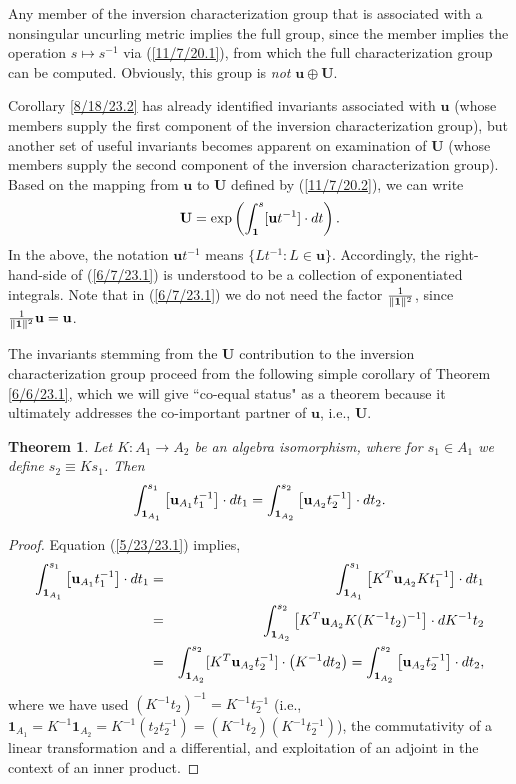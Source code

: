 \documentclass{amsart}
\numberwithin{equation}{section}
\newtheorem{theorem}{Theorem}
\theoremstyle{definition}
\numberwithin{theorem}{section}
\begin{document}
Any member of the inversion characterization group that is associated with a nonsingular uncurling metric implies the full group, since the member implies the operation $s\mapsto s^{-1}$ via (\ref{11/7/20.1}), from which the full characterization group can be computed.  Obviously, this group is {\it not} $\mathbf{u}\oplus\mathbf{U}$. 

Corollary \ref{8/18/23.2} has already identified invariants associated with $\mathbf{u}$ (whose members supply the first component of the inversion characterization group), but another set of useful invariants becomes apparent on examination of $\mathbf{U}$ (whose members supply the second component of the inversion characterization group).  Based on the mapping from $\mathbf{u}$ to $\mathbf{U}$ defined by (\ref{11/7/20.2}),  we can write \begin{equation}  \mathbf{U} = \exp\left(\int_{\bf 1}^s [\mathbf{u}t^{-1}]\cdot dt\right). \label{6/7/23.1}\end{equation}  In the above, the notation $\mathbf{u}t^{-1}$ means $\{Lt^{-1}: L\in \mathbf{u}\}$.  Accordingly, the right-hand-side of (\ref{6/7/23.1}) is understood to be a collection of exponentiated integrals.   Note that in (\ref{6/7/23.1}) we do not need the factor $\frac{1}{\|{\bf 1}\|^2}$, since $\frac{1}{\|{\bf 1}\|^2}\mathbf{u}=\mathbf{u}$.  



The invariants stemming from the $\mathbf{U}$ contribution to the inversion characterization group proceed from the following simple corollary of Theorem \ref{6/6/23.1}, which we will give ``co-equal status" as a theorem because it ultimately addresses the co-important  partner of $\mathbf{u}$, i.e., $\mathbf{U}$. 



\begin{theorem}\label{6/6/23.2} Let $K:A_1\rightarrow A_2$ be an algebra isomorphism, where for $s_1\in A_1$ we define $s_2\equiv Ks_1$.  Then \[ \int_{{\bf 1}_{A_1}}^{s_1} \left[\mathbf{u}_{A_1}t_1^{-1}\right]\cdot dt_1 
= \int_{{\bf 1}_{A_2}}^{s_2} \left[\mathbf{u}_{A_2}t_2^{-1}\right]\cdot dt_2 . \] \end{theorem}

\begin{proof} 
Equation (\ref{5/23/23.1}) implies,
\begin{eqnarray*} \int_{{\bf 1}_{A_1}}^{s_1} \left[\mathbf{u}_{A_1}t_1^{-1}\right]\cdot dt_1 &=& \int_{{\bf 1}_{A_1}}^{s_1} \left[ K^T\mathbf{u}_{A_2}Kt_1^{-1}\right]\cdot dt_1 \\ &=& 
\int_{{\bf 1}_{A_2}}^{s_2} \left[ K^T\mathbf{u}_{A_2}K (K^{-1}t_2)^{-1}\right]\cdot dK^{-1}t_2 \\ &=& \int_{{\bf 1}_{A_2}}^{s_2} [K^T\mathbf{u}_{A_2}t_2^{-1}]\cdot \left(K^{-1}dt_2\right) = \int_{{\bf 1}_{A_2}}^{s_2} \left[\mathbf{u}_{A_2}t_2^{-1}\right]\cdot dt_2, 
\end{eqnarray*}
where we have used $(K^{-1}t_2)^{-1} = K^{-1}t_2^{-1}$ (i.e., $\mathbf{1}_{A_1} = K^{-1}\mathbf{1}_{A_2} = K^{-1}(t_2t_2^{-1}) = (K^{-1}t_2)(K^{-1}t_2^{-1})$), the commutativity of a linear transformation and a differential, and exploitation of an adjoint in the context of an inner product.
\end{proof}
\end{document}
